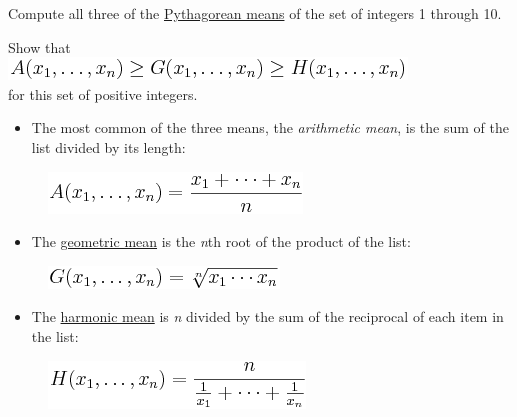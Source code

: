 Compute all three of the
\href{http://en.wikipedia.org/wiki/Pythagorean\_means}{Pythagorean
means} of the set of integers 1 through 10.

Show that \\
\includegraphics[scale=.6]{graphics/6d547901f0a5fb3819d16aca0048b3ed.png} \\
for this set of positive integers.

\begin{itemize}
\item The most common of the three means, the \emph{arithmetic mean},
  is the sum of the list divided by its length:
\end{itemize}

\begin{figure}[htbp]
\centering
\includegraphics[scale=.6]{graphics/2b72903b5dd461c777da13fde57f3ebb.png}
\end{figure}

\begin{itemize}
\item
  The \href{http://en.wikipedia.org/wiki/Geometric\_mean}{geometric
  mean} is the \emph{n}th root of the product of the list:
\end{itemize}

\begin{figure}[htbp]
\centering
\includegraphics[scale=.6]{graphics/12595bb2b15b5d8b7263aba68c137db3.png}
\end{figure}

\begin{itemize}
\item
  The \href{http://en.wikipedia.org/wiki/Harmonic\_mean}{harmonic mean}
  is \emph{n} divided by the sum of the reciprocal of each item in the
  list:
\end{itemize}

\begin{figure}[htbp]
\centering
\includegraphics[scale=.6]{graphics/7f1c92a1977747914e9c5127764a9be4.png}
\end{figure}

